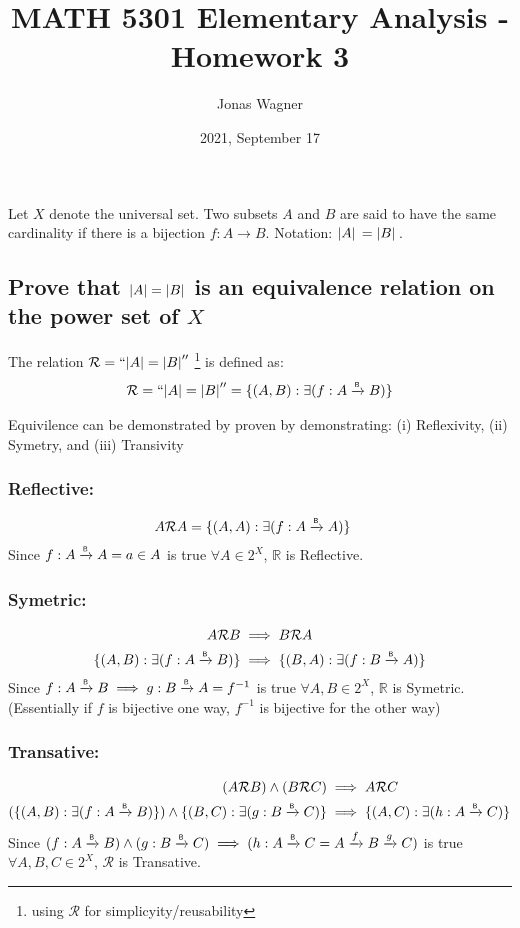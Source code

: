 \documentclass[]{article}
\title{MATH 5301 Elementary Analysis - Homework 3}
\author{Jonas Wagner}
\date{2021, September 17}
\newcommand{\Rel}{\mathcal{R}}
\newcommand{\R}{\mathbb{R}}
\newcommand{\toB}{\xrightarrow{\textsf{\tiny B}}}
\begin{document}
\maketitle

\section{}
Let $X$ denote the universal set. Two subsets $A$ and $B$ are said to have 
the same cardinality if there is a bijection $f : A \to B$.
Notation: $\abs*{A} = \abs*{B}$.

\subsection{
	Prove that $\abs{A} = \abs{B}$ is an equivalence relation on the power set of $X$
}

The relation $\Rel = ``\abs{A} = \abs{B}''$
\footnote{using $\Rel$ for simplicyity/reusability} 
is defined as: 
$$\Rel = ``\abs{A} = \abs{B}'' = \{(A,B) : \exists (f : A \xrightarrow{\textsf{\tiny B}} B)\}$$

Equivilence can be demonstrated by proven by demonstrating: 
(i) Reflexivity, (ii) Symetry, and (iii) Transivity


\subsubsection{Reflective:}
\begin{align*}
	A \Rel A
		&= \{(A,A) : \exists (f : A \toB A)\}
\end{align*}
Since $f : A \toB A = {a \in A}$ is true $\forall A \in 2^X$, $\R$ is Reflective.

\subsubsection{Symetric:}
\begin{align*}
	A \Rel B 
		&\implies B \Rel A\\
	\{(A,B) : \exists (f : A \xrightarrow{\textsf{\tiny B}} B)\}
		&\implies \{(B,A) : \exists (f : B \xrightarrow{\textsf{\tiny B}} A)\}
\end{align*}
Since $f : A \toB B \implies g : B \toB A = f^{-1}$ is true $\forall A,B \in 2^X$, 
$\R$ is Symetric.\\
(Essentially if $f$ is bijective one way, 
$f^{-1}$ is bijective for the other way)

\subsubsection{Transative:}
\begin{align*}
	(A \Rel B) 
		\land (B \Rel C) 
		&\implies A \Rel C\\
	(\{(A,B) : \exists (f : A \xrightarrow{\textsf{\tiny B}} B)\})
		\land \{(B,C) : \exists (g : B \xrightarrow{\textsf{\tiny B}} C)\}
		&\implies \{(A,C) : \exists (h : A \xrightarrow{\textsf{\tiny B}} C)\}
\end{align*}
Since $(f : A \toB B) \land (g : B \toB C) 
\implies (h : A \toB C = A \xrightarrow{f} B \xrightarrow{g} C)$ 
is true $\forall A,B,C \in 2^X$, $\Rel$ is Transative.\\
\end{document}
